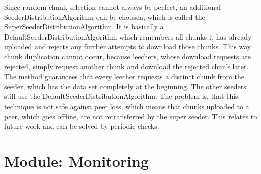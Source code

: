 Since random chunk selection cannot always be perfect, an additional SeederDistributionAlgorithm can be choosen, which is called the SuperSeederDistributionAlgorithm. It is basically a DefaultSeederDistributionAlgorithm which remembers all chunks it has already uploaded and rejects any further attempts to download those chunks. This way chunk duplication cannot occur, because leechers, whose download requests are rejected, simply request another chunk and download the rejected chunk later. The method guarantees that every leecher requests a distinct chunk from the seeder, which has the data set completely at the beginning. The other seeders still use the DefaultSeederDistributionAlgorithm. The problem is, that this technique is not safe against peer loss, which means that chunks uploaded to a peer, which goes offline, are not retransferred by the super seeder. This relates to future work and can be solved by periodic checks.

\cleardoublepage
\section{Module: Monitoring}
\label{sec:monitoring}

